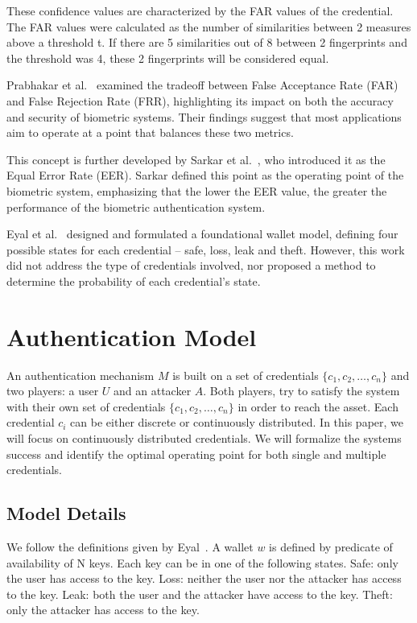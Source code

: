 \documentclass{article}
\begin{document}
These confidence values are characterized by the FAR values of the credential. The FAR values were calculated as the number of similarities between 2 measures above a threshold t. If there are 5 similarities out of 8 between 2 fingerprints and the threshold was 4, these 2 fingerprints will be considered equal.

Prabhakar et al.~\cite{prabhakar2003} examined the tradeoff between False Acceptance Rate (FAR) and False Rejection Rate (FRR), highlighting its impact on both the accuracy and security of biometric systems. Their findings suggest that most applications aim to operate at a point that balances these two metrics.

This concept is further developed by Sarkar et al.~\cite{sarkar2020}, who introduced it as the Equal Error Rate (EER). Sarkar defined this point as the operating point of the biometric system, emphasizing that the lower the EER value, the greater the performance of the biometric authentication system.

Eyal et al.~\cite{Eyal2021} designed and formulated a foundational wallet model, defining four possible states for each credential – safe, loss, leak and theft. However, this work did not address the type of credentials involved, nor proposed a method to determine the probability of each credential’s state.
\section{Authentication Model}
An authentication mechanism $M$ is built on a set of credentials $\{c_1, c_2, \ldots, c_n\}$ and two players: a user $U$ and an attacker $A$. Both players, try to satisfy the system with their own set of credentials $\{c_1, c_2, \ldots, c_n\}$ in order to reach the asset. Each credential $c_i$ can be either discrete or continuously distributed. In this paper, we will focus on continuously distributed credentials. We will formalize the systems success and identify the optimal operating point for both single and multiple credentials.
\subsection{Model Details}
We follow the definitions given by Eyal~\cite{Eyal2021}. A wallet $w$ is defined by predicate of availability of N keys. Each key can be in one of the following states. Safe: only the user has access to the key. Loss: neither the user nor the attacker has access to the key. Leak: both the user and the attacker have access to the key. Theft: only the attacker has access to the key.
\end{document}
